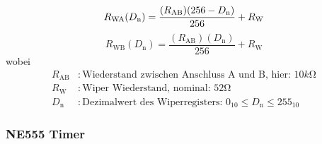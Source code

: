 \begin{equation}
    R_{\text{\text{WA}}}(D_{\text{n}}) = \frac{(R_{\text{AB}}) (256 - D_{\text{n}})}{256} + R_{\text{W}}
    \label{eq:resistance1}
\end{equation}
\begin{equation}
    R_{\text{WB}}(D_{\text{n}}) = \frac{(R_{\text{AB}}) (D_{\text{n}})}{256} + R_{\text{W}}
    \label{eq:resistance2}
\end{equation}
wobei
\begin{align*}
    R_{\text{AB}} &: \text{Wiederstand zwischen Anschluss A und B, hier: } 10\si{k\ohm} \\
    R_{\text{W}} &: \text{Wiper Wiederstand, nominal: } 52\si{\ohm}  \\
    D_{\text{n}} &: \text{Dezimalwert des Wiperregisters: } 0_{10} \leq D_{\text{n}} \leq 255_{10}
\end{align*}

\subsubsection{NE555 Timer}

